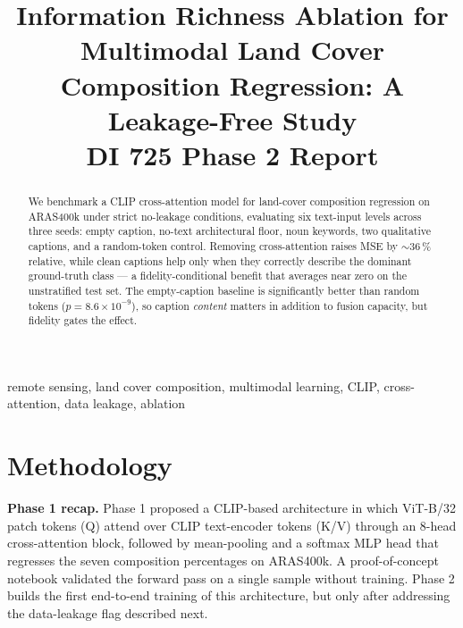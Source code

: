 \documentclass[conference]{IEEEtran}
\begin{document}
\title{Information Richness Ablation for Multimodal Land Cover Composition Regression: A Leakage-Free Study\\
{\large DI 725 Phase 2 Report}}

\author{
}

\maketitle

\begin{abstract}
We benchmark a CLIP cross-attention model for land-cover composition
regression on ARAS400k under strict no-leakage conditions, evaluating six
text-input levels across three seeds: empty caption, no-text architectural
floor, noun keywords, two qualitative captions, and a random-token control.
Removing cross-attention raises MSE by $\sim$36\,\% relative, while clean
captions help only when they correctly describe the dominant ground-truth
class --- a fidelity-conditional benefit that averages near zero on the
unstratified test set. The empty-caption baseline is significantly better
than random tokens ($p=8.6\!\times\!10^{-9}$), so caption \emph{content}
matters in addition to fusion capacity, but fidelity gates the effect.
\end{abstract}

\begin{IEEEkeywords}
remote sensing, land cover composition, multimodal learning, CLIP,
cross-attention, data leakage, ablation
\end{IEEEkeywords}

\section{Methodology}
\label{sec:method}

\textbf{Phase 1 recap.} Phase 1 proposed a CLIP-based architecture in
which ViT-B/32 patch tokens (Q) attend over CLIP text-encoder tokens
(K/V) through an 8-head cross-attention block, followed by mean-pooling
and a softmax MLP head that regresses the seven composition percentages
on ARAS400k. A proof-of-concept notebook validated the forward pass on a
single sample without training. Phase 2 builds the first end-to-end
training of this architecture, but only after addressing the data-leakage
flag described next.
\end{document}
